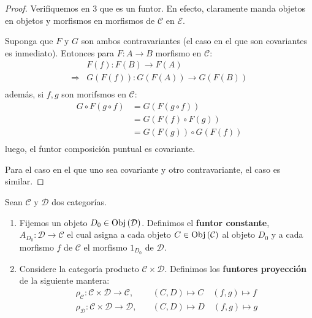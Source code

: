 \documentclass[12pt]{report}
\newcounter{it}
\theoremstyle{largebreak}
\newcommand\cf[3]{\ensuremath{#1:#2\rightarrow#3}}
\newcommand{\Obj}[1]{\ensuremath{\textup{Obj}\left(#1\right)}}
\begin{document}
    \begin{proof}
        Verifiquemos en 3 que es un funtor. En efecto, claramente manda objetos en objetos y morfismos en morfismos de $\mathcal{C}$ en $\mathcal{E}$.
        
        Suponga que $F$ y $G$ son ambos contravariantes (el caso en el que son covariantes es inmediato). Entonces para $\cf{F}{A}{B}$ morfismo en $\mathcal{C}$:
        \begin{equation*}
            \begin{split}
                &\cf{F(f)}{F(B)}{F(A)}\\
                \Rightarrow &\cf{G(F(f))}{G(F(A))}{G(F(B))}\\
            \end{split}
        \end{equation*}
        además, si $f,g$ son morifsmos en $\mathcal{C}$:
        \begin{equation*}
            \begin{split}
                G\circ F(g\circ f)&=G(F(g\circ f))\\
                &=G(F(f)\circ F(g))\\
                &=G(F(g))\circ G(F(f))\\
            \end{split}
        \end{equation*}
        luego, el funtor composición puntual es covariante.

        Para el caso en el que uno sea covariante y otro contravariante, el caso es similar.
    \end{proof}

    \begin{mydef}
        Sean $\mathcal{C}$ y $\mathcal{D}$ dos categorías.
        \begin{enumerate}
            \item Fijemos un objeto $D_0\in\Obj{\mathcal{D}}$. Definimos el \textbf{funtor constante}, $\cf{A_{D_0}}{\mathcal{D}}{\mathcal{C}}$ el cual asigna a cada objeto $C\in\Obj{\mathcal{C}}$ al objeto $D_0$ y a cada morfismo $f$ de $\mathcal{C}$ el morfismo $1_{D_0}$ de $\mathcal{D}$.
            \item Considere la categoría producto $\mathcal{C}\times\mathcal{D}$. Definimos los \textbf{funtores proyección} de la siguiente mantera:
            \begin{equation*}
                \begin{split}
                    \cf{\rho_{\mathcal{C}}}{\mathcal{C}\times\mathcal{D}}{\mathcal{C}}, &\quad(C,D)\mapsto C\quad (f,g)\mapsto f \\
                    \cf{\rho_{\mathcal{D}}}{\mathcal{C}\times\mathcal{D}}{\mathcal{D}}, &\quad(C,D)\mapsto D\quad (f,g)\mapsto g \\
                \end{split}
            \end{equation*}
        \end{enumerate}
    \end{mydef}
\end{document}
